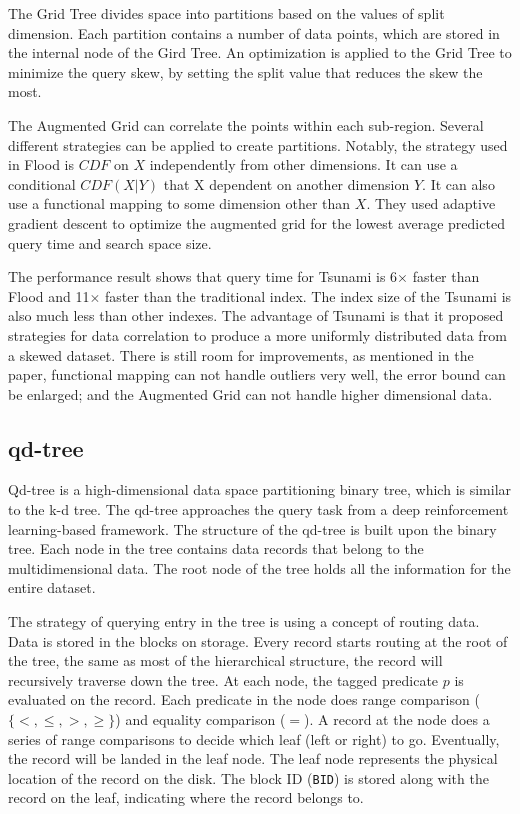 The Grid Tree divides space into partitions based on the values of split dimension. Each partition contains a number of data points, which are stored in the internal node of the Gird Tree. An optimization is applied to the Grid Tree to minimize the query skew, by setting the split value that reduces the skew the most. 

The Augmented Grid can correlate the points within each sub-region. Several different strategies can be applied to create partitions. Notably, the strategy used in Flood is $CDF$ on $X$ independently from other dimensions. It can use a conditional $CDF(X|Y)$ that X dependent on another dimension $Y$. It can also use a functional mapping to some dimension other than $X$. They used adaptive gradient descent to optimize the augmented grid for the lowest average predicted query time and search space size. 

The performance result shows that query time for Tsunami is 6$\times$ faster than Flood and 11$\times$ faster than the traditional index. The index size of the Tsunami is also much less than other indexes. The advantage of Tsunami is that it proposed strategies for data correlation to produce a more uniformly distributed data from a skewed dataset. There is still room for improvements, as mentioned in the paper, functional mapping can not handle outliers very well, the error bound can be enlarged; and the Augmented Grid can not handle higher dimensional data. 

\subsection{qd-tree}
Qd-tree \cite{Yang:2020ev} is a high-dimensional data space partitioning binary tree, which is similar to the k-d tree. The qd-tree approaches the query task from a deep reinforcement learning-based framework. The structure of the qd-tree is built upon the binary tree. Each node in the tree contains data records that belong to the multidimensional data. The root node of the tree holds all the information for the entire dataset. 

The strategy of querying entry in the tree is using a concept of routing data. Data is stored in the blocks on storage. Every record starts routing at the root of the tree, the same as most of the hierarchical structure, the record will recursively traverse down the tree. At each node, the tagged predicate $p$ is evaluated on the record. Each predicate in the node does range comparison ($\{<, \leq, >, \geq\}$) and equality comparison ($=$). A record at the node does a series of range comparisons to decide which leaf (left or right) to go.  Eventually, the record will be landed in the leaf node. The leaf node represents the physical location of the record on the disk. The block ID (\texttt{BID}) is stored along with the record on the leaf, indicating where the record belongs to. 

